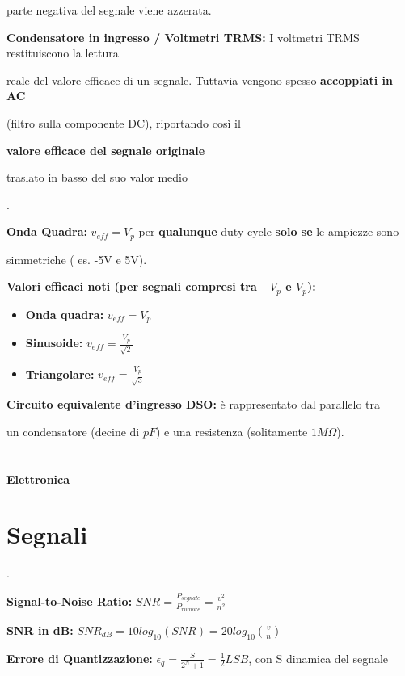 \documentclass[12pt]{extarticle}
\begin{document}
parte negativa del segnale viene azzerata.
\newpage

{\bf Condensatore in ingresso / Voltmetri TRMS:} I voltmetri TRMS restituiscono la lettura

reale del valore efficace di un segnale. Tuttavia vengono spesso {\bf accoppiati in AC} 

(filtro sulla componente DC), riportando così il {\bf valore efficace del segnale originale

traslato in basso del suo valor medio}.

{\bf Onda Quadra:} $\displaystyle v_{eff} = V_p$ per {\bf qualunque} duty-cycle {\bf solo se} le ampiezze sono 

simmetriche ( es. -5V e 5V).

{\bf Valori efficaci noti (per segnali compresi tra $\displaystyle -V_p$ e $\displaystyle V_p$):} 
\begin{itemize}
    \item {\bf Onda quadra:}  $\displaystyle v_{eff} = V_p$
    \item {\bf Sinusoide:} $\displaystyle v_{eff} = \frac{V_p}{\sqrt{2}}$
    \item {\bf Triangolare:} $\displaystyle v_{eff} = \frac{V_p}{\sqrt{3}}$
\end{itemize}

{\bf Circuito equivalente d'ingresso DSO:} è rappresentato dal parallelo tra 

un condensatore (decine di $\displaystyle pF $) e una resistenza (solitamente $\displaystyle 1M\Omega $).
\\\\\\

{\bf \Huge Elettronica}
\setcounter{section}{0}
\section{Segnali}.


{\bf Signal-to-Noise Ratio:} $\displaystyle SNR = \frac{P_{segnale}}{P_{rumore}} = \frac{v^2}{n^2}$ 

{\bf SNR in dB:} $\displaystyle SNR_{dB} = 10log_{10}(SNR) = 20log_{10}(\frac{v}{n})$

{\bf Errore di Quantizzazione:} $\displaystyle \epsilon_q = \frac{S}{2^N+1} = \frac{1}{2}LSB $, con S dinamica del segnale
\end{document}
